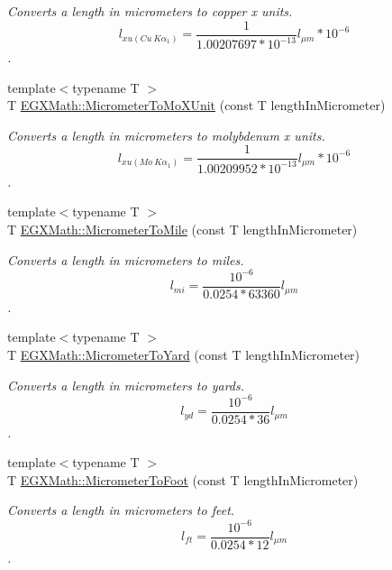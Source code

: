 \begin{DoxyCompactItemize}
\begin{DoxyCompactList}\small\item\em Converts a length in micrometers to copper x units. \[ l_{xu(Cu\ K\alpha_1)}= \frac{1}{1.00207697*10^{-13}} l_{\mu m} * 10^{-6}\]. \end{DoxyCompactList}\item 
{\footnotesize template$<$typename T $>$ }\\T \mbox{\hyperlink{group___e_g_x_math-_conversions-_length_conversions-_s_i-_micrometer-_non-_s_i_ga2ed475ce56e23d7783d6925f5b409f44}{E\+G\+X\+Math\+::\+Micrometer\+To\+Mo\+X\+Unit}} (const T length\+In\+Micrometer)
\begin{DoxyCompactList}\small\item\em Converts a length in micrometers to molybdenum x units. \[ l_{xu(Mo\ K\alpha_1)}=\frac{1}{1.00209952*10^{-13}} l_{\mu m} * 10^{-6}\]. \end{DoxyCompactList}\item 
{\footnotesize template$<$typename T $>$ }\\T \mbox{\hyperlink{group___e_g_x_math-_conversions-_length_conversions-_s_i-_micrometer-_imperial_ga0419c861d5edc78538ff023c12b9b6d9}{E\+G\+X\+Math\+::\+Micrometer\+To\+Mile}} (const T length\+In\+Micrometer)
\begin{DoxyCompactList}\small\item\em Converts a length in micrometers to miles. \[ l_{mi}=\frac{10^{-6}}{0.0254 * 63360} l_{\mu m} \]. \end{DoxyCompactList}\item 
{\footnotesize template$<$typename T $>$ }\\T \mbox{\hyperlink{group___e_g_x_math-_conversions-_length_conversions-_s_i-_micrometer-_imperial_ga3152a5a36ea33c2ab85fe275569f5ac0}{E\+G\+X\+Math\+::\+Micrometer\+To\+Yard}} (const T length\+In\+Micrometer)
\begin{DoxyCompactList}\small\item\em Converts a length in micrometers to yards. \[ l_{yd}= \frac{10^{-6}}{0.0254 * 36} l_{\mu m} \]. \end{DoxyCompactList}\item 
{\footnotesize template$<$typename T $>$ }\\T \mbox{\hyperlink{group___e_g_x_math-_conversions-_length_conversions-_s_i-_micrometer-_imperial_gaed71a8fede89b4bc87d3967e4d99c30d}{E\+G\+X\+Math\+::\+Micrometer\+To\+Foot}} (const T length\+In\+Micrometer)
\begin{DoxyCompactList}\small\item\em Converts a length in micrometers to feet. \[ l_{ft}= \frac{10^{-6}}{0.0254 * 12} l_{\mu m} \]. \end{DoxyCompactList}\item 

\end{DoxyCompactItemize}
